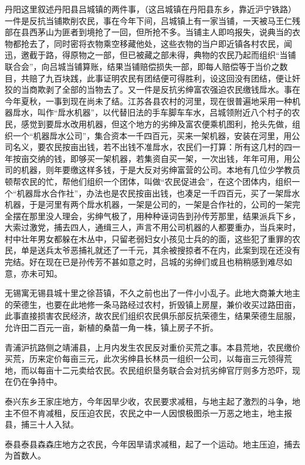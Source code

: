 丹阳这里叙述丹阳县吕城镇的两件事，（这吕城镇在丹阳县东乡，靠近沪宁铁路）一件是反抗当铺欺削农民，事在今年下间，吕城镇上有一家当铺，一天被马王仁残部在县西茅山为匪者到境抢了一回，但所抢不多。当铺主人即呜报失，说典当的衣物都抢去了，同时密将衣物乘空移藏他处，这些衣物的当户即近镇各村农民，闻迅，邀截于路，得原物之一部，但已被藏之部未得，典物的农民乃起而组织“当铺联合会”，向吕城当铺算账，结果当铺赔偿损失一部，即每人赔偿等于当价之数目，共赔了九百块践，此事证明农民有团结便可得胜利，设这回没有团结，便让奸狡的当商欺剥了全部的当物去了。又一件是反抗劣绅富农强迫农民缴钱戽水。事在今年夏秋，一事到现在尚未了结。江苏各县农村的河里，现在很普遍地采用一种机器戽水，叫作“戽水机器”，以代替旧法的手车脚车车水，吕城领附近八个村子的农民，感觉到要戽水改用机器，但这个地方的劣绅及富农便乘机图利，抢头先做，组织一个“机器戽水公司”，集合资本一千四百元，买来一架机器，安装在河里，用公司名义，要农民按亩出钱，若不出钱不准戽水，农民们一打算：所有这几村的四一年按亩交纳的钱，即够买一架机器，若集资自买一架，一次出钱，年年可用，用公司的机器，则年要缴这样多钱，于是大反对劣绅富营的公司。本地有几位少学教员顿帮农民的忙，帮他们组织一个团体，叫做“农民促进会”，在这个团体内，组织一个“机器戽水合作社”，办法也是农民按亩出钱，也凑足一千四百元，买了一架戽水机器，于是河里有两个戽水机器，一架是公司的，一架是合作社的，公司的一架完全摆在那里没人理会，劣绅气极了，用种种诬词告到孙传芳那里，结果派兵下乡，大索过激党，捕去四人，通缉三人，声言不用公司机器的人都要重办，当兵来时，村中壮年男女都躲在木丛中，只留老弱妇女小孩见士兵的的面，这些犯了重罪的农民，单是送兵太爷恶捕礼就还了一千元，其余被搜掠者不在内，此案到现在还没有完结。好在现在已是孙传芳不甚如意之时，吕城的劣绅们或且也稍稍感到难尽如意，亦未可知。

无锡寓无锡县城十里之徐苔镇，不久之前也出了一件小小乱子。此地大商兼大地主的荣德生，也要在此地修一条马路经过农村，折毁镇上房屋，兼价收买过路田亩，此事直接损害农民经济，故农民们组织农民俱乐部反抗荣德生，结果荣德生屈服，允许田二百元一亩，新植的桑苗一角一株，镇上房子不折。

青浦沪抗路侧之靖浦县，上月内发生农民反对重价买荒之事。本县荒地，农民缴价买荒，历来定价每亩三元，此次劣绅县长林员一组织一公司，以每亩三元领得荒地，而以每亩十二元卖给农民。农民组织垦务联合会对抗劣绅官厅则多方恐吓，现在仍在争持中。

泰兴东乡王家庄地方，今年因旱少收，农民要求减租，与地主起了激烈的斗争，地主不但不肯减租，反压迫农民，农民之中一人因恨极图杀一万恶之地主，地主报县，捕三十人入狱。

泰县泰县森森庄地方之农民，今年因旱请求减租，起了一个运动。地主压迫，捕去为首数人。

